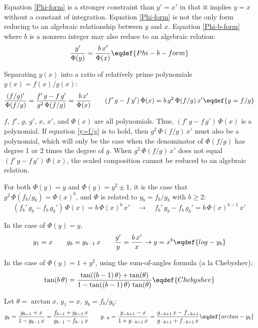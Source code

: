 Equation \eqref{Phi-form} is a stronger constraint than $y'=x'$ in
that it implies $y=x$ without a constant of integration.
Equation \eqref{Phi-form} is not the only form reducing to an
algebraic relationship between $y$ and $x$.
Equation \eqref{Phi-b-form} where $b$ is a nonzero integer may also
reduce to an algebraic relation:
$${y'\over\Phi(y)}={b\,x'\over\Phi(x)}\eqdef{Phi-b-form}$$

Separating $y(x)$ into a ratio of relatively prime polynomials
$y(x)=f(x)/g(x)$:
$${(f/g)'\over\Phi(f/g)}=
   {f'\,g-f\,g'\over g^2\,\Phi(f/g)}={b\,x'\over\Phi(x)}\qquad
   ({f'\,g-f\,g'})\,{\Phi(x)}=b\,g^2\,\Phi(f/g)\,x'\eqdef{y=f/g}$$

$f$, $f'$, $g$, $g'$, $x$, $x'$, and $\Phi(x)$ are all polynomials.
Thus, $({f'\,g-f\,g'})\,{\Phi(x)}$ is a polynomial.  If
equation \eqref{y=f/g} is to hold, then $g^2\,\Phi(f/g)\,x'$ must also
be a polynomial, which will only be the case when the denominator of
$\Phi(f/g)$ has degree 1 or 2 times the degree of $g$.  When
$g^2\,\Phi(f/g)\,x'$ does not equal $({f'\,g-f\,g'})\,{\Phi(x)}$, the
scaled composition cannot be reduced to an algebraic relation.

For both $\Phi(y)=y$ and $\Phi(y)=y^2\pm1$, it is the case that
$g^2\,\Phi(f_b/g_b)={\Phi(x)}^b$, and $\Phi$ is related to
$y_b=f_b/g_b$ with $b\ge2$:
$$\left({f_b'\,g_b-f_b\,g_b'}\right)\,{\Phi(x)}=b\,{\Phi(x)}^b\,x'\quad\to\quad
  {f_b'\,g_b-f_b\,g_b'}=b\,{\Phi(x)}^{b-1}\,x'$$

In the case of $\Phi(y)=y$,
$$y_1=x\qquad y_{b}=y_{b-1}\,x\qquad {y'\over y}={b\,x'\over x}\to y=x^b\eqdef{log-y_b}$$

In the case of $\Phi(y)=1+y^2$, using the sum-of-angles formula (a la
Chebyshev):
$$\tan(b\,\theta)={\tan((b-1)\,\theta)+\tan(\theta)\over1-\tan((b-1)\,\theta)\,\tan(\theta)}\eqdef{Chebyshev}$$

Let $\theta=\arctan x$, $y_{1}=x$, $y_b=f_b/g_b$:
$$y_{b}={y_{b-1}+x\over1-y_{b-1}\,x}=
  {f_{b-1}+g_{b-1}\,x\over g_{b-1}-f_{b-1}\,x}\qquad
  y_{-b}={y_{-b+1}-x\over1+y_{-b+1}\,x}=
  {g_{-b+1}\,x-f_{-b+1}\over g_{-b+1}+f_{-b+1}\,x}\eqdef{arctan-y_b}$$

